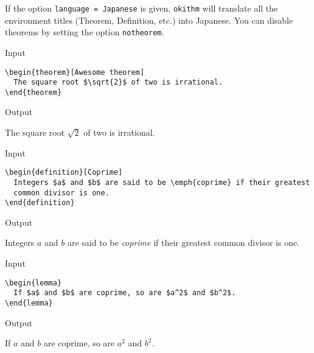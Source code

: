 \documentclass[a4paper, 11pt]{article}
\begin{document}
If the option \texttt{language = Japanese} is given, \texttt{okithm} will translate all the environment titles (Theorem, Definition, etc.) into Japanese.
You can disable theorems by setting the option \texttt{notheorem}.

\begin{itembox}[l]{Input}
\begin{verbatim}
\begin{theorem}[Awesome theorem]
  The square root $\sqrt{2}$ of two is irrational.
\end{theorem}
\end{verbatim}
\end{itembox}

\begin{itembox}[l]{Output}
  \begin{theorem}
    The square root $\sqrt{2}$ of two is irrational.
  \end{theorem}
\end{itembox}

\begin{itembox}[l]{Input}
\begin{verbatim}
\begin{definition}[Coprime]
  Integers $a$ and $b$ are said to be \emph{coprime} if their greatest
  common divisor is one.
\end{definition}
\end{verbatim}
\end{itembox}

\begin{itembox}[l]{Output}
  \begin{definition}[Coprime]
    Integers $a$ and $b$ are said to be \emph{coprime} if their greatest
    common divisor is one.
  \end{definition}
\end{itembox}

\begin{itembox}[l]{Input}
\begin{verbatim}
\begin{lemma}
  If $a$ and $b$ are coprime, so are $a^2$ and $b^2$.
\end{lemma}
\end{verbatim}
\end{itembox}

\begin{itembox}[l]{Output}
  \begin{lemma}
    If $a$ and $b$ are coprime, so are $a^2$ and $b^2$.
  \end{lemma}
\end{itembox}
\end{document}
